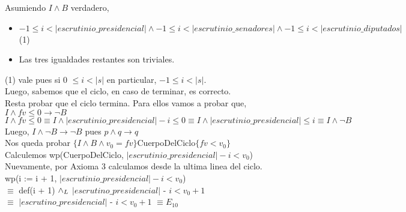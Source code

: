 \documentclass[10pt,a4paper]{article}
\begin{document}
\noindent Asumiendo $I \land B$ verdadero,

\begin{itemize}\setlength{\itemindent}{0.5cm}
	\item $-1 \leq i < |escrutinio\_presidencial| \land -1 \leq i < |escrutinio\_senadores| \land -1 \leq i < |escrutinio\_diputados|$ (1)
	\item Las tres igualdades restantes son triviales.
\end{itemize}

\noindent (1) vale pues si 0 $\leq i < |s| $ en particular, $-1 \leq i < |s|$. \\

\noindent Luego, sabemos que el ciclo, en caso de terminar, es correcto. \\

\noindent Resta probar que el ciclo termina. Para ellos vamos a probar que, \\

\noindent $I \land fv \leq 0 \rightarrow \neg B$ \\

\noindent $I \land fv \leq 0 \equiv I \land |escrutinio\_presidencial| - i \leq 0 \equiv I \land |escrutinio\_presidencial| \leq i \equiv I \land \neg B$ \\

\noindent Luego, $I \land \neg B \rightarrow \neg B$ pues $p \land q \rightarrow q$ \\

\noindent Nos queda probar $\{I \land B \land v_0 = fv\}$CuerpoDelCiclo$\{fv < v_0\}$ \\

\noindent Calculemos wp(CuerpoDelCiclo, $|escrutinio\_presidencial| - i < v_0$) \\

\noindent Nuevamente, por Axioma 3 calculamos desde la ultima linea del ciclo. \vspace{0.1cm} \\

\noindent wp(i := i + 1, $|escrutinio\_presidencial| - i < v_0$) \\

\noindent $\equiv$ def(i + 1) $\land _L$ $|escrutino\_presidencial|$  - $i < v_0 + 1$\\

\noindent $\equiv$ $|escrutino\_presidencial|$  - $i < v_0 + 1$ $\equiv E_{10}$ \vspace{0.3cm} \\
\end{document}
